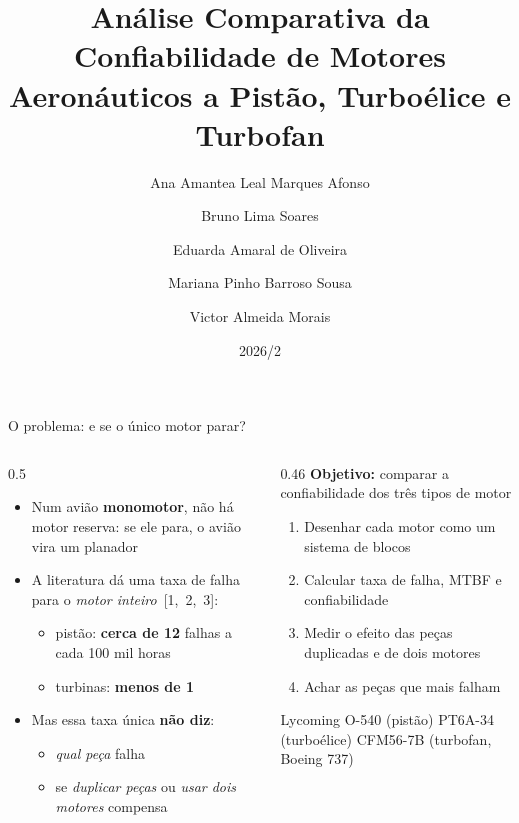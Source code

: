 \documentclass[aspectratio=169,11pt]{beamer}
\title{Análise Comparativa da Confiabilidade de Motores Aeronáuticos a Pistão, Turboélice e Turbofan}
\author{Ana Amantea Leal Marques Afonso \and Bruno Lima Soares \and Eduarda Amaral de Oliveira
  \and Mariana Pinho Barroso Sousa \and Victor Almeida Morais}
\institute{Confiabilidade de Sistemas \textbar{} Engenharia de Sistemas, Universidade Federal de Minas Gerais}
\date{2026/2}
\newcommand{\destaque}[1]{{\color{ieeeblue}\bfseries #1}}
\begin{document}
\begin{frame}[plain]
  \titlepage
\end{frame}

\begin{frame}{O problema: e se o único motor parar?}
  \begin{columns}[T]
    \begin{column}{0.5\textwidth}
      \begin{itemize}
        \item Num avião \textbf{monomotor}, não há motor reserva: se ele para, o avião vira um planador
        \item A literatura dá uma taxa de falha para o \emph{motor inteiro}~[1,~2,~3]:
          \begin{itemize}
            \item pistão: \destaque{cerca de 12} falhas a cada 100 mil horas
            \item turbinas: \destaque{menos de 1}
          \end{itemize}
        \item Mas essa taxa única \textbf{não diz}:
          \begin{itemize}
            \item \emph{qual peça} falha
            \item se \emph{duplicar peças} ou \emph{usar dois motores} compensa
          \end{itemize}
      \end{itemize}
    \end{column}
    \begin{column}{0.46\textwidth}
      \textbf{Objetivo:} comparar a confiabilidade dos três tipos de motor
      \vspace{1mm}
      \begin{enumerate}\small
        \item Desenhar cada motor como um sistema de blocos
        \item Calcular taxa de falha, MTBF e confiabilidade
        \item Medir o efeito das peças duplicadas e de dois motores
        \item Achar as peças que mais falham
      \end{enumerate}
      \vspace{1mm}
      {\footnotesize\color{cinza} Lycoming O-540 (pistão) \textbar{} PT6A-34 (turboélice) \textbar{} CFM56-7B (turbofan, Boeing 737)\par}
    \end{column}
  \end{columns}
\end{frame}
\end{document}

